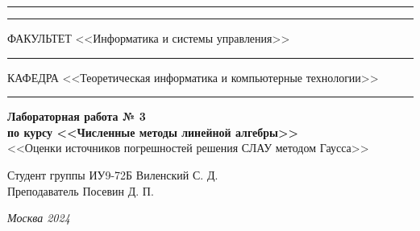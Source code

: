 \documentclass[a4paper, 14pt]{extarticle}
\begin{document}
\begin{titlepage}
\vspace{-25pt}
\hspace{-35pt}\rule{\textwidth}{2.3pt}

\vspace*{-20.3pt}
\hspace{-35pt}\rule{\textwidth}{0.4pt}

\vspace{1.5ex}
\hspace{-35pt} \noindent \small ФАКУЛЬТЕТ\hspace{80pt} <<Информатика и системы управления>>

\vspace*{-16pt}
\hspace{47pt}\rule{0.83\textwidth}{0.4pt}

\vspace{0.5ex}
\hspace{-35pt} \noindent \small КАФЕДРА\hspace{50pt} <<Теоретическая информатика и компьютерные технологии>>

\vspace*{-16pt}
\hspace{30pt}\rule{0.866\textwidth}{0.4pt}
  
\vspace{11em}

\begin{center}
\Large {\bf Лабораторная работа № 3} \\ 
\large {\bf по курсу <<Численные методы линейной алгебры>>} \\
\large <<Оценки источников погрешностей решения СЛАУ методом Гаусса>> 
\end{center}\normalsize

\vspace{8em}


\begin{flushright}
  {Студент группы ИУ9-72Б Виленский С. Д. \hspace*{15pt}\\ 
  \vspace{2ex}
  Преподаватель Посевин Д. П.\hspace*{15pt}}
\end{flushright}

\bigskip

\vfill
 

\begin{center}
\textsl{Москва 2024}
\end{center}
\end{titlepage}
\end{document}
